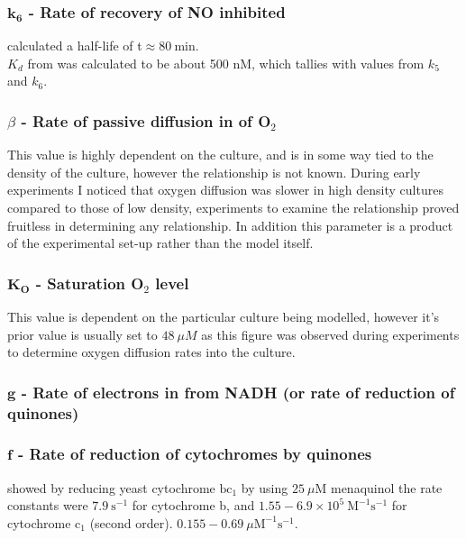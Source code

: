 \subsubsection*{$\mathbf{k_6}$ {\bf- Rate of recovery of NO inhibited \cbbthree{}}}
\citet{Giuffre2000} calculated a half-life of t\textonehalf $\approx 80~\mathrm{min}$.\\
$K_d$ from \citet{Rock2007} was calculated to be about 500 nM, which tallies with values from $k_5$ and $k_6$.

\subsubsection*{$\beta$ {\bf- Rate of passive diffusion in of O$_{\textrm{2}}$}}
This value is highly dependent on the culture, and is in some way tied to the density of the culture, however the relationship is not known. During early experiments I noticed that oxygen diffusion was slower in high density cultures compared to those of low density, experiments to examine the relationship proved fruitless in determining any relationship. In addition this parameter is a product of the experimental set-up rather than the model itself.

\subsubsection*{$\mathbf{K_O}$ {\bf- Saturation O$_{\textrm{2}}$ level}}
This value is dependent on the particular culture being modelled, however it's prior value is usually set to $48~\mu M$ as this figure was observed during experiments to determine oxygen diffusion rates into the culture.

\subsubsection*{$\mathbf{g}$ {\bf- Rate of electrons in from NADH (or rate of reduction of quinones)}}


\subsubsection*{$\mathbf{f}$ {\bf- Rate of reduction of cytochromes by quinones}}
\citet{Snyder2000} showed by reducing yeast cytochrome $\mathrm{bc}_1$ by using $25~\mu\mathrm{M}$ menaquinol the rate constants were $7.9~\mathrm{s}^{-1}$ for cytochrome b, and $1.55-6.9\times10^5~\mathrm{M}^{-1}\mathrm{s}^{-1}$ for cytochrome $\mathrm{c}_1$ (second order). $0.155 - 0.69~\mu\mathrm{M}^{-1}\mathrm{s}^{-1}$.

